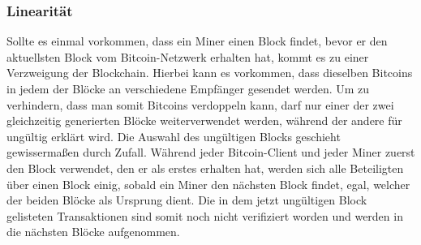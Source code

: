 \subsubsection{Linearität}

Sollte es einmal vorkommen, dass ein Miner einen Block findet, bevor er den aktuellsten Block vom Bitcoin-Netzwerk erhalten hat, kommt es zu einer Verzweigung der Blockchain.
Hierbei kann es vorkommen, dass dieselben Bitcoins in jedem der Blöcke an verschiedene Empfänger gesendet werden.
Um zu verhindern, dass man somit Bitcoins verdoppeln kann, darf nur einer der zwei gleichzeitig generierten Blöcke weiterverwendet werden, während der andere für ungültig erklärt wird.
Die Auswahl des ungültigen Blocks geschieht gewissermaßen durch Zufall.
Während jeder Bitcoin-Client und jeder Miner zuerst den Block verwendet, den er als erstes erhalten hat, werden sich alle Beteiligten über einen Block einig, sobald ein Miner den nächsten Block findet, egal, welcher der beiden Blöcke als Ursprung dient.
Die in dem jetzt ungültigen Block gelisteten Transaktionen sind somit noch nicht verifiziert worden und werden in die nächsten Blöcke aufgenommen.
